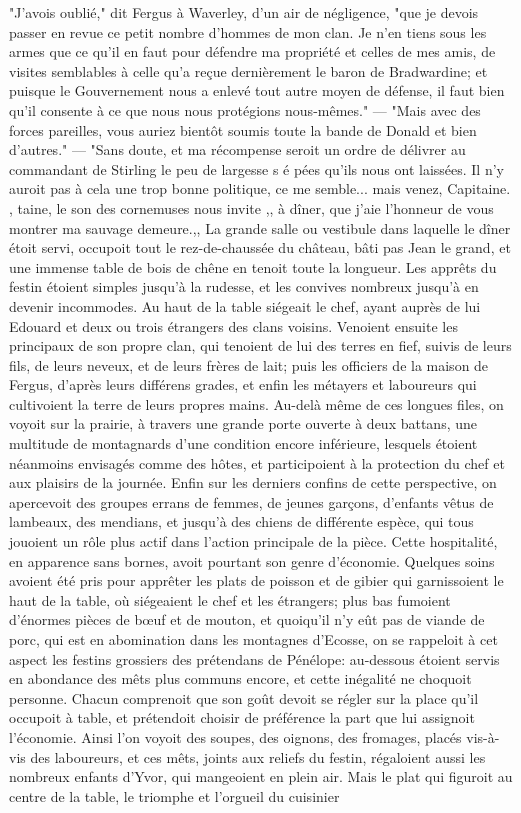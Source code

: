 "J'avois oublié," dit Fergus à Waverley, d'un air de négligence, "que je devois passer en revue ce petit nombre d'hommes de mon clan. Je n'en tiens sous les armes que ce qu'il en faut pour défendre ma propriété et celles de mes amis, de visites semblables à celle qu'a reçue dernièrement le baron de Bradwardine; et puisque le Gouvernement nous a enlevé tout autre moyen de défense, il faut bien qu'il consente à ce que nous nous protégions nous-mêmes." — "Mais avec des forces pareilles, vous auriez bientôt soumis toute la bande de Donald et bien d'autres." — "Sans doute, et ma récompense seroit un ordre de délivrer au commandant de Stirling le peu de largesse s é pées qu'ils nous ont laissées. Il n'y auroit pas à cela une trop bonne politique, ce me semble... mais venez, Capitaine.\setcounter{page}{120} , taine, le son des cornemuses nous invite ,, à dîner, que j'aie l'honneur de vous montrer ma sauvage demeure.,, La grande salle ou vestibule dans laquelle le dîner étoit servi, occupoit tout le rez-de-chaussée du château, bâti pas Jean le grand, et une immense table de bois de chêne en tenoit toute la longueur. Les apprêts du festin étoient simples jusqu'à la rudesse, et les convives nombreux jusqu'à en devenir incommodes. Au haut de la table siégeait le chef, ayant auprès de lui Edouard et deux ou trois étrangers des clans voisins. Venoient ensuite les principaux de son propre clan, qui tenoient de lui des terres en fief, suivis de leurs fils, de leurs neveux, et de leurs frères de lait; puis les officiers de la maison de Fergus, d'après leurs différens grades, et enfin les métayers et laboureurs qui cultivoient la terre de leurs propres mains. Au-delà même de ces longues files, on voyoit sur la prairie, à travers une grande porte ouverte à deux battans, une multitude de montagnards d'une condition encore inférieure, lesquels étoient néanmoins envisagés comme des hôtes, et participoient à la protection du chef et aux plaisirs de la journée. Enfin sur les derniers\setcounter{page}{121} confins de cette perspective, on apercevoit des groupes errans de femmes, de jeunes garçons, d'enfants vêtus de lambeaux, des mendians, et jusqu'à des chiens de différente espèce, qui tous jouoient un rôle plus actif dans l'action principale de la pièce. Cette hospitalité, en apparence sans bornes, avoit pourtant son genre d'économie. Quelques soins avoient été pris pour apprêter les plats de poisson et de gibier qui garnissoient le haut de la table, où siégeaient le chef et les étrangers; plus bas fumoient d'énormes pièces de bœuf et de mouton, et quoiqu'il n'y eût pas de viande de porc, qui est en abomination dans les montagnes d'Ecosse, on se rappeloit à cet aspect les festins grossiers des prétendans de Pénélope: au-dessous étoient servis en abondance des mêts plus communs encore, et cette inégalité ne choquoit personne. Chacun comprenoit que son goût devoit se régler sur la place qu'il occupoit à table, et prétendoit choisir de préférence la part que lui assignoit l'économie. Ainsi l'on voyoit des soupes, des oignons, des fromages, placés vis-à-vis des laboureurs, et ces mêts, joints aux reliefs du festin, régaloient aussi les nombreux enfants d'Yvor, qui mangeoient en plein air.\setcounter{page}{122} Mais le plat qui figuroit au centre de la table, le triomphe et l'orgueil du cuisinier 